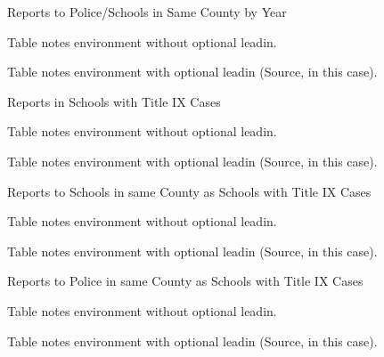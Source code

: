 \documentclass[AER]{AEA}
\begin{document}
\begin{table}
\caption{Reports to Police/Schools in Same County by Year}



\begin{tablenotes}
Table notes environment without optional leadin.
\end{tablenotes}
\begin{tablenotes}[Source]
Table notes environment with optional leadin (Source, in this case).
\end{tablenotes}
\end{table}

\begin{table}
\caption{Reports in Schools with Title IX Cases}



\begin{tablenotes}
Table notes environment without optional leadin.
\end{tablenotes}
\begin{tablenotes}[Source]
Table notes environment with optional leadin (Source, in this case).
\end{tablenotes}
\end{table}

\begin{table}
\caption{Reports to Schools in same County as Schools with Title IX Cases}



\begin{tablenotes}
Table notes environment without optional leadin.
\end{tablenotes}
\begin{tablenotes}[Source]
Table notes environment with optional leadin (Source, in this case).
\end{tablenotes}
\end{table}

\begin{table}
\caption{Reports to Police in same County as Schools with Title IX Cases}



\begin{tablenotes}
Table notes environment without optional leadin.
\end{tablenotes}
\begin{tablenotes}[Source]
Table notes environment with optional leadin (Source, in this case).
\end{tablenotes}
\end{table}
\end{document}
